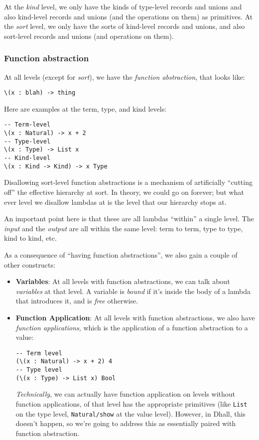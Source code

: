 \documentclass[]{article}
\begin{document}
At the \emph{kind} level, we only have the kinds of type-level records and
unions and also kind-level records and unions (and the operations on them) as
primitives. At the \emph{sort} level, we only have the sorts of kind-level
records and unions, and also sort-level records and unions (and operations on
them).

\hypertarget{function-abstraction}{%
\subsubsection{Function abstraction}\label{function-abstraction}}

At all levels (except for \emph{sort}), we have the \emph{function abstraction},
that looks like:

\begin{verbatim}
\(x : blah) -> thing
\end{verbatim}

Here are examples at the term, type, and kind levels:

\begin{verbatim}
-- Term-level
\(x : Natural) -> x + 2
-- Type-level
\(x : Type) -> List x
-- Kind-level
\(x : Kind -> Kind) -> x Type
\end{verbatim}

Disallowing sort-level function abstractions is a mechanism of artificially
``cutting off'' the effective hierarchy at sort. In theory, we could go on
forever; but what ever level we disallow lambdas at is the level that our
hierarchy stops at.

An important point here is that these are all lambdas ``within'' a single level.
The \emph{input} and the \emph{output} are all within the same level: term to
term, type to type, kind to kind, etc.

As a consequence of ``having function abstractions'', we also gain a couple of
other constructs:

\begin{itemize}
\item
  \textbf{Variables}: At all levels with function abstractions, we can talk
  about \emph{variables} at that level. A variable is \emph{bound} if it's
  inside the body of a lambda that introduces it, and is \emph{free} otherwise.
\item
  \textbf{Function Application}: At all levels with function abstractions, we
  also have \emph{function applications}, which is the application of a function
  abstraction to a value:

\begin{verbatim}
-- Term level
(\(x : Natural) -> x + 2) 4
-- Type level
(\(x : Type) -> List x) Bool
\end{verbatim}

  \emph{Technically}, we can actually have function application on levels
  without function applications, of that level has the appropriate primitives
  (like \texttt{List} on the type level, \texttt{Natural/show} at the value
  level). However, in Dhall, this doesn't happen, so we're going to address this
  as essentially paired with function abstraction.
\end{itemize}
\end{document}
